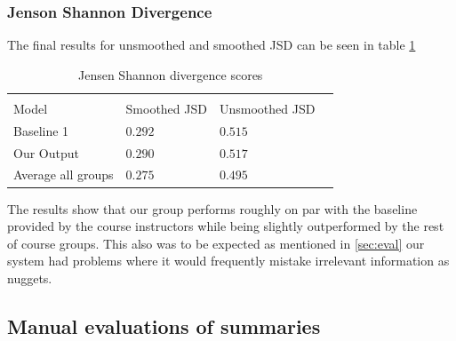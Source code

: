 \documentclass{article}
\begin{document}


\subsubsection{Jenson Shannon Divergence}
The final results for unsmoothed and smoothed JSD can be seen in table \ref{tab:jensen}

\begin{table}
	\caption{Jensen Shannon divergence scores}
	\label{tab:jensen}
	\centering
	\begin{tabular}{llll}
		\toprule
		\multicolumn{3}{c}{}                   \\
		
		Model     & Smoothed JSD & Unsmoothed JSD \\
		\midrule
		Baseline 1 & $0.292$  & $0.515$ \\
		Our Output     & $0.290$ & $0.517$    \\
		Average all groups & $0.275$& $0.495$ \\
		\bottomrule
	\end{tabular}
\end{table}

The results show that our group performs roughly on par with the baseline provided by the course instructors while being slightly outperformed by the rest of course groups. This also was to be expected as mentioned in \ref{sec:eval} our system had problems where it would frequently mistake irrelevant information as nuggets.
\subsection{Manual evaluations of summaries}
\label{subsec:maneval}







\end{document}
